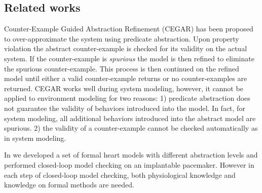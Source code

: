 \subsection{Related works}
Counter-Example Guided Abstraction Refinement (CEGAR) \cite{CEGAR} has been proposed to over-approximate the system using predicate abstraction. Upon property violation the abstract counter-example is checked for its validity on the actual system. If the counter-example is \emph{spurious} the model is then refined to eliminate the spurious counter-example. This process is then continued on the refined model until either a valid counter-example returns or no counter-examples are returned. CEGAR works well during system modeling, however, it cannot be applied to environment modeling for two reasons: 1) predicate abstraction does not guarantee the validity of behaviors introduced into the model. In fact, for system modeling, all additional behaviors introduced into the abstract model are spurious. 2) the validity of a counter-example cannot be checked automatically as in system modeling. 

In \cite{sttt13} we developed a set of formal heart models with different abstraction levels and performed closed-loop model checking on an implantable pacemaker. 
However in each step of closed-loop model checking, both physiological knowledge and knowledge on formal methods are needed.

